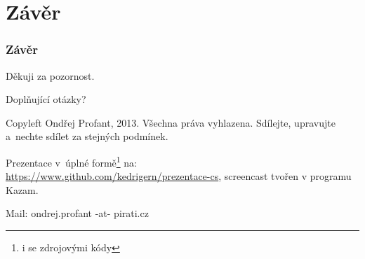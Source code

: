 \documentclass[xetex]{beamer}
\begin{document}
\section{Závěr}

\begin{frame}
  \frametitle{Závěr}
	Děkuji za pozornost.

	\bigskip
	
	Doplňující otázky?

	\bigskip

	\bigskip

	\scriptsize
	Copyleft Ondřej Profant, 2013. Všechna práva vyhlazena. Sdílejte, upravujte a~nechte sdílet za stejných podmínek. 

	\bigskip

	Prezentace v~úplné formě\footnote{i se zdrojovými kódy} na:\\ 
	\url{https://www.github.com/kedrigern/prezentace-cs}, screencast tvořen v programu Kazam.

	\bigskip

	Mail: ondrej.profant -at- pirati.cz 
\end{frame}
\end{document}
